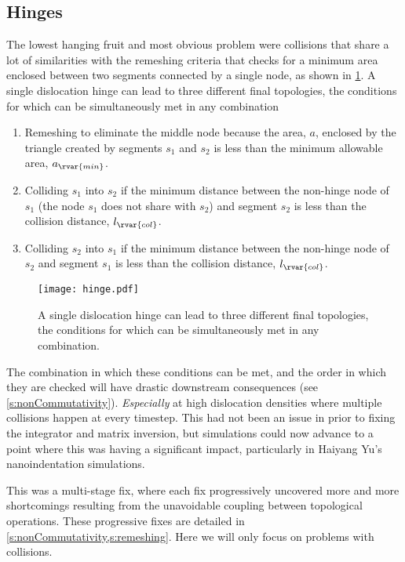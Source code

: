 \subsection{Hinges}\label{ss:hinges}
The lowest hanging fruit and most obvious problem were collisions that share a lot of similarities with the remeshing criteria that checks for a minimum area enclosed between two segments connected by a single node, as shown in \cref{f:hinge}. A single dislocation hinge can lead to three different final topologies, the conditions for which can be simultaneously met in any combination
\begin{enumerate}
    \item Remeshing to eliminate the middle node because the area, $a$, enclosed by the triangle created by segments $s_1$ and $s_2$ is less than the minimum allowable area, $a_{\rvar{min}}$.
    \item Colliding $s_1$ into $s_2$ if the minimum distance between the non-hinge node of $s_1$ (the node $s_1$ does not share with $s_2$) and segment $s_2$ is less than the collision distance, $l_{\rvar{col}}$.
    \item Colliding $s_2$ into $s_1$ if the minimum distance between the non-hinge node of $s_2$ and segment $s_1$ is less than the collision distance, $l_{\rvar{col}}$.
\end{enumerate}
\begin{figure}
    \centering
    \texttt{[image: hinge.pdf]}
    \caption[A single dislocation hinge can lead to three different final topologies.]{A single dislocation hinge can lead to three different final topologies, the conditions for which can be simultaneously met in any combination.}
    \label{f:hinge}
\end{figure}

The combination in which these conditions can be met, and the order in which they are checked will have drastic downstream consequences (see \cref{s:nonCommutativity}). \emph{Especially} at high dislocation densities where multiple collisions happen at every timestep. This had not been an issue in prior to fixing the integrator and matrix inversion, but simulations could now advance to a point where this was having a significant impact, particularly in Haiyang Yu's nanoindentation simulations.

This was a multi-stage fix, where each fix progressively uncovered more and more shortcomings resulting from the unavoidable coupling between topological operations. These progressive fixes are detailed in \cref{s:nonCommutativity,s:remeshing}. Here we will only focus on problems with collisions.

